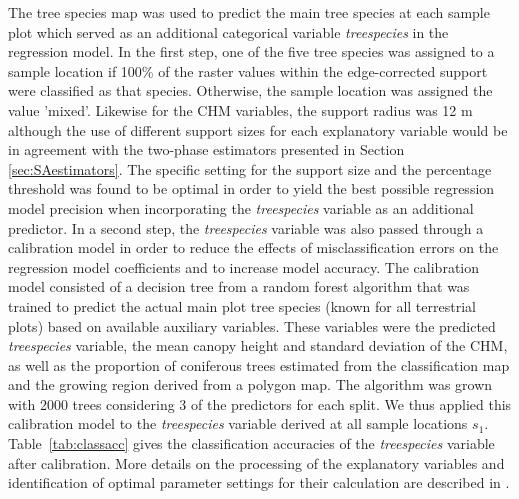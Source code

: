 \documentclass[remotesensing,article,accept,moreauthors,pdftex,10pt,a4paper]{Definitions/mdpi}
\begin{document}
The tree species map was used to predict the main tree species at each sample plot which served as an additional categorical variable \textit{treespecies} in the regression model. In the first step, one of the five tree species was assigned to a sample location if 100\% of the raster values within the edge-corrected support were classified as that species. Otherwise, the sample location was assigned the value 'mixed'. Likewise for the CHM variables, the support radius was 12 m although the use of different support sizes for each explanatory variable would be in agreement with the two-phase estimators presented in Section \ref{sec:SAestimators}. The specific setting for the support size and the percentage threshold was found to be optimal in order to yield the best possible regression model precision when incorporating the \textit{treespecies} variable as an additional predictor. In a second step, the \textit{treespecies} variable was also passed through a calibration model in order to reduce the effects of misclassification errors on the regression model coefficients and to increase model accuracy. The calibration model consisted of a decision tree from a random forest algorithm \citep{breiman2001} that was trained to predict the actual main plot tree species (known for all terrestrial plots) based on available auxiliary variables. These variables were the predicted \textit{treespecies} variable, the mean canopy height and standard deviation of the CHM, as well as the proportion of coniferous trees estimated from the classification map and the growing region derived from a polygon map. The algorithm was grown with 2000 trees considering 3 of the predictors for each split. We thus applied this calibration model to the \textit{treespecies} variable derived at all sample locations $s_1$. Table~\ref{tab:classacc} gives the classification accuracies \citep{congalton2008} of the \textit{treespecies} variable after calibration. More details on the processing of the explanatory variables and identification of optimal parameter settings for their calculation are described in \citet{hill2017a}.
\end{document}
